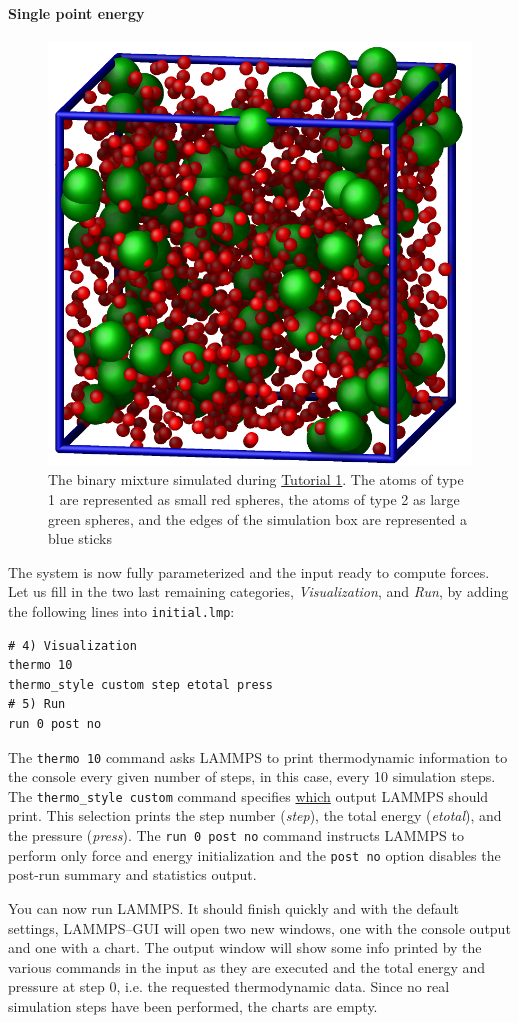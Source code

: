 \documentclass[9pt,tutorial]{livecoms}
\renewcommand{\emph}[1]{\underline{#1}} %
\newcommand{\lmpcmd}[1]{\hspace{0pt}\colorbox{listing}{\textcolor{command}{\texttt{#1}}}\hspace{0pt}} %
\newcommand{\flecmd}[1]{\textcolor{command}{\texttt{#1}}} %
\begin{document}
\paragraph{Single point energy}
\begin{figure}
\centering
\includegraphics[width=0.55\linewidth]{LJ}
\caption{The binary mixture simulated during \hyperref[lennard-jones-label]{Tutorial 1}.
  The atoms of type 1 are represented as small red spheres, the atoms of type 2 as large
  green spheres, and the edges of the simulation box are represented a blue sticks}
\label{fig:LJ}
\end{figure}

The system is now fully parameterized and the input ready to compute
forces.  Let us fill in the two last remaining categories,
\textit{Visualization}, and \textit{Run}, by adding the following lines
into \flecmd{initial.lmp}:
\begin{lstlisting}
# 4) Visualization
thermo 10
thermo_style custom step etotal press
# 5) Run
run 0 post no
\end{lstlisting}

The \lmpcmd{thermo 10} command asks LAMMPS to print thermodynamic
information to the console every given number of steps, in this case,
every 10 simulation steps.  The \lmpcmd{thermo\_style custom} command
specifies \emph{which} output LAMMPS should print.  This selection
prints the step number (\textit{step}), the total energy
(\textit{etotal}), and the pressure (\textit{press}).  The \lmpcmd{run
  0 post no} command instructs LAMMPS to perform only force and energy
initialization and the \lmpcmd{post no} option disables the post-run
summary and statistics output.

You can now run LAMMPS.  It should finish quickly and with the default
settings, LAMMPS--GUI will open two new windows, one with the console
output and one with a chart.  The output window will show some info
printed by the various commands in the input as they are executed and
the total energy and pressure at step 0, i.e. the requested thermodynamic
data.  Since no real simulation steps have been performed, the charts
are empty.
\end{document}
